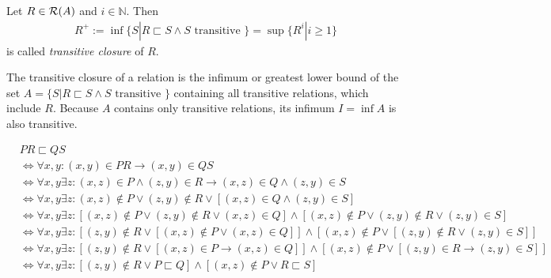 \begin{definition}
Let $R \in \mathcal{R}(A)$ and $i \in \mathbb{N}$.
Then
\begin{align}
R^{+}
:= \inf \{ S | R \sqsubset S \wedge S \text{ transitive } \}
= \sup \{ R^{i} | i \geq 1 \}
\end{align}
is called \emph{transitive closure} of $R$.
\end{definition}

The transitive closure of a relation is the infimum or greatest lower bound of the set $A = \{ S | R \sqsubset S \wedge S \text{ transitive } \}$ containing all transitive relations, which include $R$.
Because $A$ contains only transitive relations, its infimum $I = \inf A$ is also transitive.

\begin{align*}
&PR \sqsubset QS
\\&\Leftrightarrow
\forall x,y:
(x,y) \in PR \rightarrow (x,y) \in QS
\\&\Leftrightarrow
\forall x,y \exists z:
(x,z) \in P \wedge (z,y) \in R \rightarrow (x,z) \in Q \wedge (z,y) \in S
\\&\Leftrightarrow
\forall x,y \exists z:
(x,z) \not\in P \vee (z,y) \not\in R
\vee 
[(x,z) \in Q \wedge (z,y) \in S]
\\&\Leftrightarrow
\forall x,y \exists z:
[(x,z) \not\in P \vee (z,y) \not\in R \vee (x,z) \in Q]
\wedge
[(x,z) \not\in P \vee (z,y) \not\in R \vee (z,y) \in S]
\\&\Leftrightarrow
\forall x,y \exists z:
[(z,y) \not\in R \vee [(x,z) \not\in P \vee (x,z) \in Q]]
\wedge
[(x,z) \not\in P \vee [(z,y) \not\in R \vee (z,y) \in S]]
\\&\Leftrightarrow
\forall x,y \exists z:
[(z,y) \not\in R \vee [(x,z) \in P \rightarrow (x,z) \in Q]]
\wedge
[(x,z) \not\in P \vee [(z,y) \in R \rightarrow (z,y) \in S]]
\\&\Leftrightarrow
\forall x,y \exists z:
[(z,y) \not\in R \vee P \sqsubset Q]
\wedge
[(x,z) \not\in P \vee R \sqsubset S]
\end{align*}

